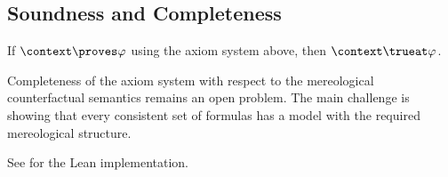 \documentclass[../LogosReference.tex]{subfiles}
\begin{document}
\subsection{Soundness and Completeness}\label{sec:soundness-completeness}

\begin{theorem}[Soundness]\label{thm:soundness}
	If $\context \proves \metaA$ using the axiom system above, then $\context \trueat \metaA$.
\end{theorem}

\begin{question}
	Completeness of the axiom system with respect to the mereological counterfactual semantics remains an open problem.
	The main challenge is showing that every consistent set of formulas has a model with the required mereological structure.
\end{question}

See  for the Lean implementation.
\end{document}
